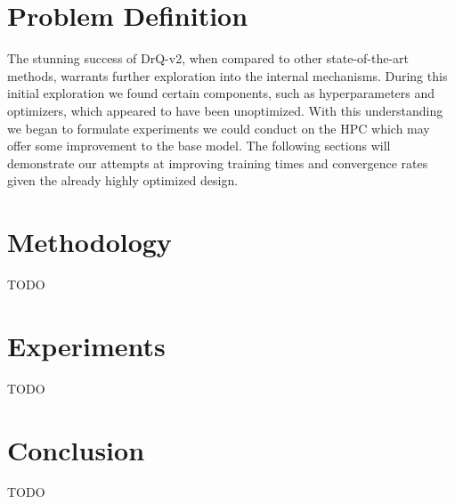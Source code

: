 \documentclass[conference]{./IEEEtran/IEEEtran} %
\begin{document}
    \section{Problem Definition}\label{sec:problem-definition}

    The stunning success of DrQ-v2, when compared to other state-of-the-art methods, warrants further exploration into the internal 
    mechanisms. During this initial exploration we found certain components, such as hyperparameters and optimizers, which appeared 
    to have been unoptimized. With this understanding we began to formulate experiments we could conduct on the HPC which may offer 
    some improvement to the base model. The following sections will demonstrate our attempts at improving training times and convergence 
    rates given the already highly optimized design.

    \section{Methodology}\label{sec:methodology}

    TODO

    \section{Experiments}\label{sec:experiments}

    TODO

    \section{Conclusion}\label{sec:conclusion}

    TODO

    
    
\end{document}
